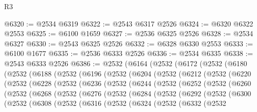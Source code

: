 \begin{lexlean}{R3}
\begin{coremodule}
@6320 := @2534 @6319
@6322 := @2543 @6317 @2526
@6324 := @6320 @6322 @2553
@6325 := @6100 @1659
@6327 := @2536 @6325 @2526
@6328 := @2534 @6327
@6330 := @2543 @6325 @2526
@6332 := @6328 @6330 @2553
@6333 := @6100 @1677
@6335 := @2536 @6333 @2526
@6336 := @2534 @6335
@6338 := @2543 @6333 @2526
@6386 := @2532
    (@6164
      (@2532
        (@6172
          (@2532
            (@6180
              (@2532
                (@6188
                  (@2532
                    (@6196
                      (@2532
                        (@6204
                          (@2532
                            (@6212
                              (@2532
                                (@6220
                                  (@2532
                                    (@6228
                                      (@2532
                                        (@6236
                                          (@2532
                                            (@6244
                                              (@2532
                                                (@6252
                                                  (@2532
                                                    (@6260
                                                      (@2532
                                                        (@6268
                                                          (@2532
                                                            (@6276
                                                              (@2532
                                                                (@6284
                                                                  (@2532
                                                                    (@6292
                                                                      (@2532
                                                                        (@6300
                                                                          (@2532
                                                                            (@6308
                                                                              (@2532
                                                                                (@6316
                                                                                  (@2532
                                                                                    (@6324
                                                                                      (@2532
                                                                                        (@6332
                                                                                          (@2532

\end{coremodule}
\end{lexlean}
